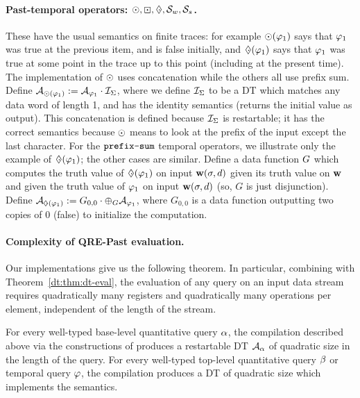 \paragraph*{Past-temporal operators: $\odot, \boxdot, \;\cdot\hspace{-0.52em}\Diamond, \mathbin{\mathcal{S}_w}, \mathbin{\mathcal{S}_s}{}$.}
These have the usual semantics on finite traces: for example $\odot(\varphi_1)$ says that $\varphi_1$ was true at the previous item, and is false initially, and $\;\cdot\hspace{-0.52em}\Diamond(\varphi_1)$ says that $\varphi_1$ was true at some point in the trace up to this point (including at the present time). The implementation of $\odot$ uses concatenation while the others all use prefix sum. Define $\mathcal{A}_{\odot(\varphi_1)} := \mathcal{A}_{\varphi_1} \cdot \mathcal{I}_{\Sigma}$, where we define $\mathcal{I}_{\Sigma}$ to be a DT which matches any data word of length 1, and has the identity semantics (returns the initial value as output). This concatenation is defined because $\mathcal{I}_{\Sigma}$ is restartable; it has the correct semantics because $\odot$ means to look at the prefix of the input except the last character.
For the $\texttt{prefix-sum}$ temporal operators, we illustrate only the example of $\;\cdot\hspace{-0.52em}\Diamond(\varphi_1)$; the other cases are similar. Define a data function $G$ which computes the truth value of $\;\cdot\hspace{-0.52em}\Diamond(\varphi_1)$ on input $\mathbf{w} (\sigma, d)$ given its truth value on $\mathbf{w}$ and given the truth value of $\varphi_1$ on input $\mathbf{w} (\sigma, d)$ (so, $G$ is just disjunction). Define $\DT_{\eventuallyT(\tq_1)} := \concat{G_{0,0}}{\prefixsum{\DT_{\tq_1}}{\DF}}$, where $G_{0,0}$ is a data function outputting two copies of $0$ (false) to initialize the computation.

\paragraph*{Complexity of QRE-Past evaluation.}
Our implementations give us the following theorem. In particular, combining with Theorem~\ref{dt:thm:dt-eval}, the evaluation of any query on an input data stream requires quadratically many registers and quadratically many operations per element, independent of the length of the stream.

\begin{theorem}
For every well-typed base-level quantitative query $\alpha$, the compilation described above via the constructions of  produces a restartable DT $\mathcal{A}_\alpha$ of quadratic size in the length of the query. For every well-typed top-level quantitative query $\beta$ or temporal query $\varphi$, the compilation produces a DT of quadratic size which implements the semantics.
\label{dt:thm:quadratic}
\end{theorem}

